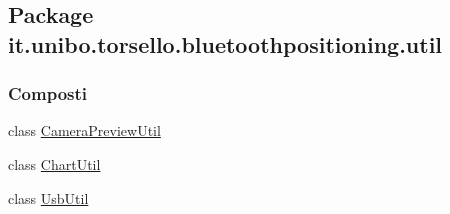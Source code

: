\hypertarget{namespaceit_1_1unibo_1_1torsello_1_1bluetoothpositioning_1_1util}{}\subsection{Package it.\+unibo.\+torsello.\+bluetoothpositioning.\+util}
\label{namespaceit_1_1unibo_1_1torsello_1_1bluetoothpositioning_1_1util}
\subsubsection*{Composti}
\begin{DoxyCompactItemize}
\item 
class \hyperlink{classit_1_1unibo_1_1torsello_1_1bluetoothpositioning_1_1util_1_1CameraPreviewUtil}{Camera\+Preview\+Util}
\item 
class \hyperlink{classit_1_1unibo_1_1torsello_1_1bluetoothpositioning_1_1util_1_1ChartUtil}{Chart\+Util}
\item 
class \hyperlink{classit_1_1unibo_1_1torsello_1_1bluetoothpositioning_1_1util_1_1UsbUtil}{Usb\+Util}
\end{DoxyCompactItemize}
